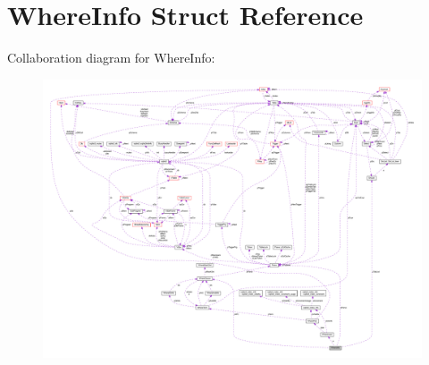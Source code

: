 \hypertarget{struct_where_info}{\section{Where\-Info Struct Reference}
\label{struct_where_info}
}


Collaboration diagram for Where\-Info\-:\nopagebreak
\begin{figure}[H]
\begin{center}
\leavevmode
\includegraphics[width=350pt]{struct_where_info__coll__graph}
\end{center}
\end{figure}
